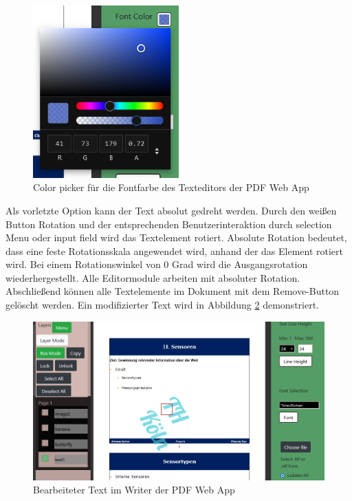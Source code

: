 \begin{figure}[!htbp]
	\centering
	\includegraphics[width=0.5\textwidth]{"images/fontcolor.png"}
	\caption{Color picker für die Fontfarbe des Texteditors der PDF Web App}
	\label{fig:fontcolor}
\end{figure}

Als vorletzte Option kann der Text absolut gedreht werden. Durch den weißen Button Rotation und der entsprechenden Benutzerinteraktion durch selection Menu oder input field wird das Textelement rotiert. Absolute Rotation bedeutet, dass eine feste Rotationsskala angewendet wird, anhand der das Element rotiert wird. Bei einem Rotationswinkel von 0 Grad wird die Ausgangsrotation wiederhergestellt. Alle Editormodule arbeiten mit absoluter Rotation. Abschließend können alle Textelemente im Dokument mit dem Remove-Button gelöscht werden. Ein modifizierter Text wird in Abbildung \ref{fig:text} demonstriert.

\begin{figure}[!htbp]
	\centering
	\includegraphics[width=1\textwidth]{"images/text.png"}
	\caption{Bearbeiteter Text im Writer der PDF Web App}
	\label{fig:text}
\end{figure}


